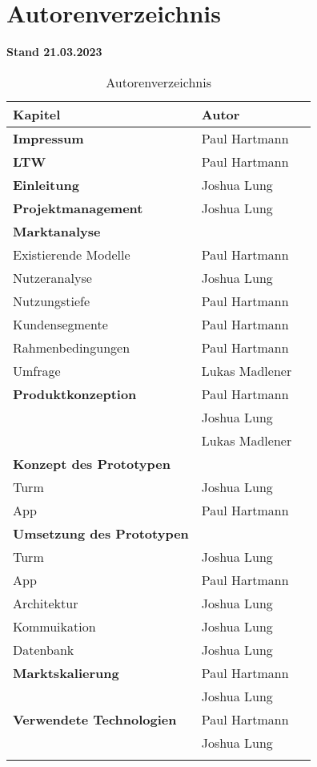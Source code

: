 \section{Autorenverzeichnis}

\textbf{Stand 21.03.2023}

\begin{longtable}{llr}
  \textbf{Kapitel}                  & \textbf{Autor} \\
  \toprule
  \textbf{Impressum}                & Paul Hartmann  \\
  \midrule
  \textbf{LTW}                      & Paul Hartmann  \\
  \midrule
  \textbf{Einleitung}               & Joshua Lung    \\
  \midrule
  \textbf{Projektmanagement}        & Joshua Lung    \\
  \midrule
  \textbf{Marktanalyse}             &                \\
  Existierende Modelle              & Paul Hartmann  \\
  Nutzeranalyse                     & Joshua Lung    \\
  Nutzungstiefe                     & Paul Hartmann  \\
  Kundensegmente                    & Paul Hartmann  \\
  Rahmenbedingungen                 & Paul Hartmann  \\
  Umfrage                           & Lukas Madlener \\
  \midrule
  \textbf{Produktkonzeption}        & Paul Hartmann  \\
                                    & Joshua Lung    \\
                                    & Lukas Madlener \\
  \midrule
  \textbf{Konzept des Prototypen}   &                \\
  Turm                              & Joshua Lung    \\
  App                               & Paul Hartmann  \\
  \midrule
  \textbf{Umsetzung des Prototypen} &                \\
  Turm                              & Joshua Lung    \\
  App                               & Paul Hartmann  \\
  Architektur                       & Joshua Lung    \\
  Kommuikation                      & Joshua Lung    \\
  Datenbank                         & Joshua Lung    \\
  \midrule
  \textbf{Marktskalierung}          & Paul Hartmann  \\
                                    & Joshua Lung    \\
  \midrule
  \textbf{Verwendete Technologien}  & Paul Hartmann  \\
                                    & Joshua Lung    \\
  \bottomrule

  \caption{Autorenverzeichnis}
  \label{tab:autorenverzeichnis}
\end{longtable}
